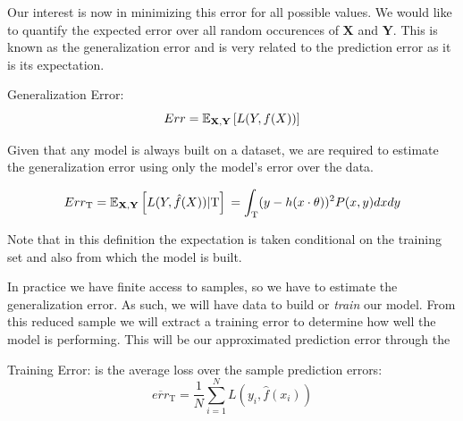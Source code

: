 Our interest is now in minimizing this error for all possible values. We would like to quantify the expected error over all random occurences of $\textbf{X}$ and $\textbf{Y}$. This is known as the generalization error and is very related to the prediction error as it is its expectation.

\begin{definition}{Generalization Error:}
\begin{equation}
Err = \operatorname{\mathbb{E}}_{ \textbf{X}, \textbf{Y} } \left[ L(Y,f(X)) \right]
\end{equation}
\end{definition}

Given that any model is always built on a dataset, we are required to estimate the generalization error using only the model's error over the data.


\begin{equation}
	Err_{\mathrm{T}} = \operatorname{\mathbb{E}}_{\textbf{X},\textbf{Y}} \left[ L(Y,\hat{f}(X)) | \mathrm{T}\right] \\
	= \int_{\mathrm{T}} (y - h(x \cdot \theta) )^2 P(x,y)dxdy
\end{equation}


Note that in this definition the expectation is taken conditional on the training set and also from which the model is built.


In practice we have finite access to samples, so we have to estimate the generalization error. As such, we will have data to build or \textit{train} our model. From this reduced sample we will extract a training error to determine how well the model is performing. This will be our approximated prediction error through the
\begin{definition}{Training Error:}
	is the average loss over the sample prediction errors:
	$$ \overline{err}_{\mathrm{T}} = \frac{1}{N} \sum_{i=1}^N L(y_i, \hat{f}(x_i) )$$
\end{definition} \label{def:trainingError}

